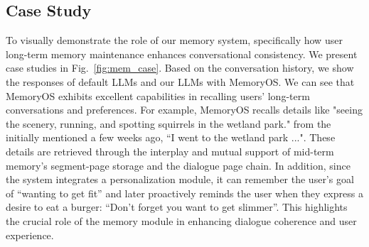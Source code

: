 \documentclass[11pt]{article}
\begin{document}




\subsection{Case Study}
To visually demonstrate the role of our memory system, specifically how user long-term memory maintenance enhances conversational consistency. We present case studies in Fig.~\ref{fig:mem_case}. Based on the conversation history, we show the responses of default LLMs and our LLMs with MemoryOS. 
We can see that MemoryOS exhibits excellent capabilities in recalling users' long-term conversations and preferences.
For example, MemoryOS recalls details like "seeing the scenery, running, and spotting squirrels in the wetland park."  from the initially mentioned a few weeks ago,  “I went to the wetland park ...". 
These details are retrieved through the interplay and mutual support of mid-term memory's segment-page storage and the dialogue page chain.
In addition, since the system integrates a personalization module, it can remember the user's goal of “wanting to get fit” and later proactively reminds the user when they express a desire to eat a burger: “Don’t forget you want to get slimmer”. 
This highlights the crucial role of the memory module in enhancing dialogue coherence and user experience.



\end{document}
